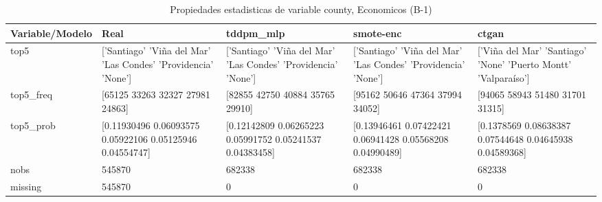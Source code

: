 \begin{table}[H]
\centering
\fontsize{8}{14}\selectfont
\caption{Propiedades  estadisticas de variable county, Economicos (B-1)}
\label{table-stats-economicos-b-1-county}
\begin{tabular}{|l|m{10em}|m{10em}|m{10em}|m{10em}|}
\hline
 \rowcolor[gray]{0.8}
Variable/Modelo & Real & tddpm\_mlp & smote-enc & ctgan \\
\hline top5 & ['Santiago' 'Viña del Mar' 'Las Condes' 'Providencia' 'None'] & ['Santiago' 'Viña del Mar' 'Las Condes' 'Providencia' 'None'] & ['Santiago' 'Viña del Mar' 'Las Condes' 'Providencia' 'None'] & ['Viña del Mar' 'Santiago' 'None' 'Puerto Montt' 'Valparaíso'] \\
\hline top5\_freq & [65125 33263 32327 27981 24863] & [82855 42750 40884 35765 29910] & [95162 50646 47364 37994 34052] & [94065 58943 51480 31701 31315] \\
\hline top5\_prob & [0.11930496 0.06093575 0.05922106 0.05125946 0.04554747] & [0.12142809 0.06265223 0.05991752 0.05241537 0.04383458] & [0.13946461 0.07422421 0.06941428 0.05568208 0.04990489] & [0.1378569  0.08638387 0.07544648 0.04645938 0.04589368] \\
\hline nobs & 545870 & 682338 & 682338 & 682338 \\
\hline missing & 545870 & 0 & 0 & 0 \\
\hline
\end{tabular}
\end{table}
